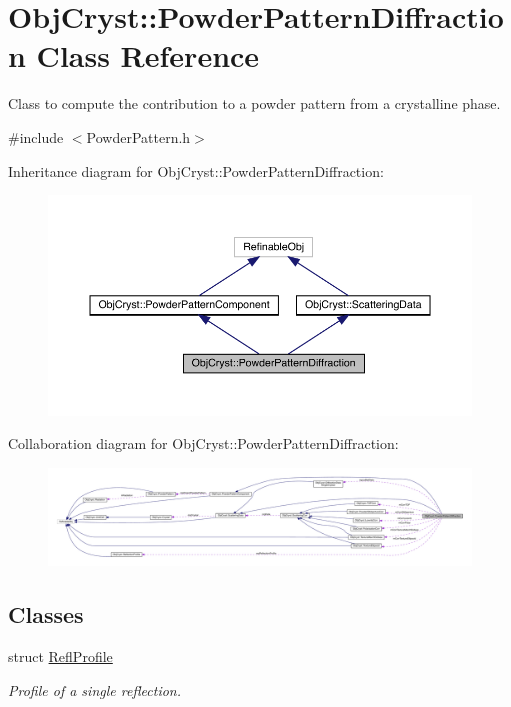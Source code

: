 \hypertarget{class_obj_cryst_1_1_powder_pattern_diffraction}{}\section{Obj\+Cryst\+::Powder\+Pattern\+Diffraction Class Reference}
\label{class_obj_cryst_1_1_powder_pattern_diffraction}


Class to compute the contribution to a powder pattern from a crystalline phase.  




{\ttfamily \#include $<$Powder\+Pattern.\+h$>$}



Inheritance diagram for Obj\+Cryst\+::Powder\+Pattern\+Diffraction\+:
\nopagebreak
\begin{figure}[H]
\begin{center}
\leavevmode
\includegraphics[width=350pt]{class_obj_cryst_1_1_powder_pattern_diffraction__inherit__graph}
\end{center}
\end{figure}


Collaboration diagram for Obj\+Cryst\+::Powder\+Pattern\+Diffraction\+:
\nopagebreak
\begin{figure}[H]
\begin{center}
\leavevmode
\includegraphics[width=350pt]{class_obj_cryst_1_1_powder_pattern_diffraction__coll__graph}
\end{center}
\end{figure}
\subsection*{Classes}
\begin{DoxyCompactItemize}
\item 
struct \mbox{\hyperlink{struct_obj_cryst_1_1_powder_pattern_diffraction_1_1_refl_profile}{Refl\+Profile}}
\begin{DoxyCompactList}\small\item\em Profile of a single reflection. \end{DoxyCompactList}\end{DoxyCompactItemize}

